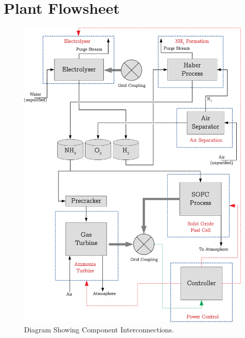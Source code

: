 \section{Plant Flowsheet}

\begin{figure}[H]
        \centering
        \includegraphics[scale=0.7]{plantdiagram.pdf}
        \caption{Diagram Showing Component Interconnections.}
        \label{fig:plantglobaldiagram}
\end{figure}